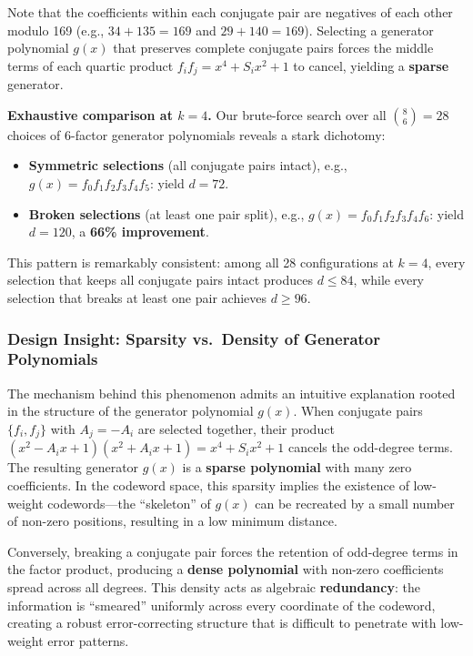 \documentclass[12pt]{article}
\theoremstyle{plain}
\numberwithin{equation}{section}
\begin{document}
\begin{enumerate}
    Note that the coefficients within each conjugate pair are negatives of each other modulo 169 (e.g., $34 + 135 = 169$ and $29 + 140 = 169$). Selecting a generator polynomial $g(x)$ that preserves complete conjugate pairs forces the middle terms of each quartic product $f_i f_j = x^4 + S_i x^2 + 1$ to cancel, yielding a \textbf{sparse} generator.

    \textbf{Exhaustive comparison at $k=4$.} Our brute-force search over all $\binom{8}{6}=28$ choices of 6-factor generator polynomials reveals a stark dichotomy:
    \begin{itemize}
        \item \textbf{Symmetric selections} (all conjugate pairs intact), e.g., $g(x) = f_0 f_1 f_2 f_3 f_4 f_5$: yield $d = 72$.
        \item \textbf{Broken selections} (at least one pair split), e.g., $g(x) = f_0 f_1 f_2 f_3 f_4 f_6$: yield $d = 120$, a \textbf{66\% improvement}.
    \end{itemize}
    This pattern is remarkably consistent: among all 28 configurations at $k=4$, every selection that keeps all conjugate pairs intact produces $d \le 84$, while every selection that breaks at least one pair achieves $d \ge 96$.
\end{enumerate}

\subsubsection*{Design Insight: Sparsity vs.\ Density of Generator Polynomials}

The mechanism behind this phenomenon admits an intuitive explanation rooted in the structure of the generator polynomial $g(x)$.
When conjugate pairs $\{f_i, f_j\}$ with $A_j = -A_i$ are selected together, their product $(x^2 - A_i x + 1)(x^2 + A_i x + 1) = x^4 + S_i x^2 + 1$ cancels the odd-degree terms. The resulting generator $g(x)$ is a \textbf{sparse polynomial} with many zero coefficients. In the codeword space, this sparsity implies the existence of low-weight codewords---the ``skeleton'' of $g(x)$ can be recreated by a small number of non-zero positions, resulting in a low minimum distance.

Conversely, breaking a conjugate pair forces the retention of odd-degree terms in the factor product, producing a \textbf{dense polynomial} with non-zero coefficients spread across all degrees. This density acts as algebraic \textbf{redundancy}: the information is ``smeared'' uniformly across every coordinate of the codeword, creating a robust error-correcting structure that is difficult to penetrate with low-weight error patterns.
\end{document}
